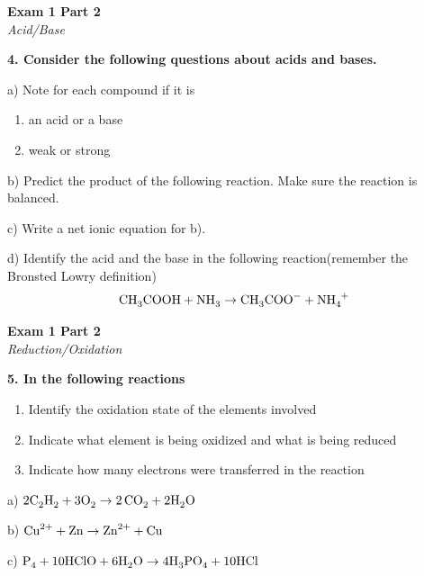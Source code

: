\documentclass{article}
\begin{document}
    \begin{center}
        \textbf{Exam 1 Part 2}\\
        \textit{Acid/Base}
    \end{center}
    \textbf{4. Consider the following questions about acids and bases.}

    a) Note for each compound if it is\\
    \begin{enumerate}
        \item an acid or a base
        \item weak or strong
    \end{enumerate}

     \qquad {}

     \qquad {}

    b) Predict the product of the following reaction. Make sure the reaction is balanced.

    c) Write a net ionic equation for b).

    d) Identify the acid and the base in the following reaction(remember the Bronsted Lowry definition)
    $$\ce{CH_{3}COOH} + \ce{NH_{3}} \rightarrow \ce{CH_{3}COO^{-}} + \ce{NH_{4}^{+}}$$
    \pagebreak


    \begin{center}
        \textbf{Exam 1 Part 2}\\
        \textit{Reduction/Oxidation}
    \end{center}
    \textbf{5. In the following reactions}
    \begin{enumerate}
        \item Identify the oxidation state of the elements involved
        \item Indicate what element is being oxidized and what is being reduced
        \item Indicate how many electrons were transferred in the reaction
    \end{enumerate}

    a) $\ce{2 C_{2}H_{2}} + \ce{3 O_{2}} \rightarrow \ce{2CO_{2}} + \ce{2 H_{2}O}$

    b) $\ce{Cu^{2+}} + \ce{Zn} \rightarrow  \ce{Zn^{2+}} + \ce{Cu}$

    c) $\ce{P_{4}} + \ce{10 HClO} + \ce{6 H_{2}O} \rightarrow \ce{4 H_{3}PO_{4}} + \ce{10 HCl}$
    \pagebreak
\end{document}
